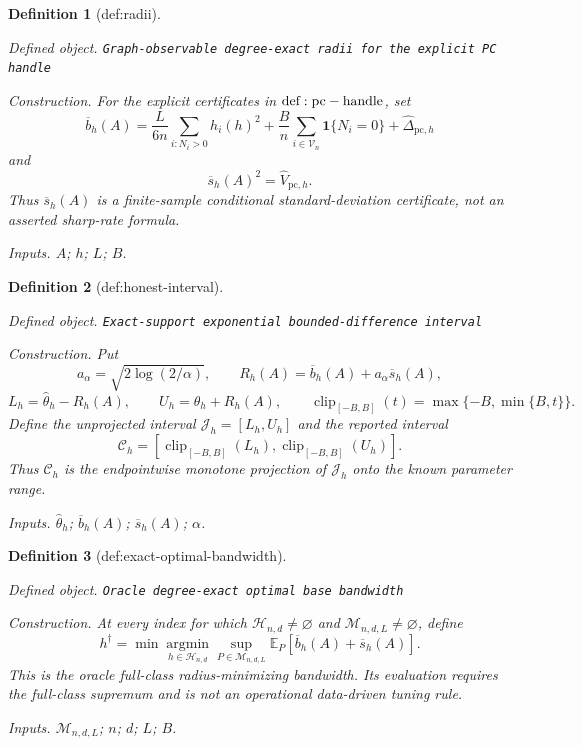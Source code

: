 \documentclass{article}
\newtheorem{definition}{Definition}
\begin{document}
\begin{definition}[def:radii]\label{def:radii}
\par\smallskip\noindent\emph{Defined object.} \texttt{Graph-\allowbreak{}observable degree-\allowbreak{}exact radii for the explicit PC handle}
\par\smallskip\noindent\emph{Construction.} For the explicit certificates in \({\rm def:pc-handle}\), set
\[
 \overline b_h(A)=\frac{L}{6n}\sum_{i:N_i>0}h_i(h)^2
 +\frac{B}{n}\sum_{i\in\mathcal V_n}\mathbf1\{N_i=0\}
 +\widehat\Delta_{\mathrm{pc},h}
\]
and
\[
 \overline s_h(A)^2=\widehat V_{\mathrm{pc},h}.
\]
Thus \(\overline s_h(A)\) is a finite-sample conditional standard-deviation certificate, not an asserted sharp-rate formula.
\par\smallskip\noindent\emph{Inputs.} \(A\); \(h\); \(L\); \(B\).
\end{definition}

\begin{definition}[def:honest-interval]\label{def:honest-interval}
\par\smallskip\noindent\emph{Defined object.} \texttt{Exact-\allowbreak{}support exponential bounded-\allowbreak{}difference interval}
\par\smallskip\noindent\emph{Construction.} Put
\[
 a_\alpha=\sqrt{2\log(2/\alpha)},\qquad
 R_h(A)=\overline b_h(A)+a_\alpha\overline s_h(A),
\]
\[
 L_h=\widehat\theta_h-R_h(A),\qquad
 U_h=\widehat\theta_h+R_h(A),\qquad
 \operatorname{clip}_{[-B,B]}(t)=\max\{-B,\min\{B,t\}\}.
\]
Define the unprojected interval \(\mathcal J_h=[L_h,U_h]\) and the reported interval
\[
 \mathcal C_h=
 [\operatorname{clip}_{[-B,B]}(L_h),
  \operatorname{clip}_{[-B,B]}(U_h)].
\]
Thus \(\mathcal C_h\) is the endpointwise monotone projection of \(\mathcal J_h\) onto the known parameter range.
\par\smallskip\noindent\emph{Inputs.} \(\widehat\theta_h\); \(\overline b_h(A)\); \(\overline s_h(A)\); \(\alpha\).
\end{definition}

\begin{definition}[def:exact-optimal-bandwidth]\label{def:exact-optimal-bandwidth}
\par\smallskip\noindent\emph{Defined object.} \texttt{Oracle degree-\allowbreak{}exact optimal base bandwidth}
\par\smallskip\noindent\emph{Construction.} At every index for which \(\mathcal H_{n,d}\ne\varnothing\) and \(\mathcal M_{n,d,L}\ne\varnothing\), define
\[
 h^\dagger=\min\operatorname*{argmin}_{h\in\mathcal H_{n,d}}
 \sup_{P\in\mathcal M_{n,d,L}}
 \mathbb E_P[\overline b_h(A)+\overline s_h(A)].
\]
This is the oracle full-class radius-minimizing bandwidth.  Its evaluation requires the full-class supremum and is not an operational data-driven tuning rule.
\par\smallskip\noindent\emph{Inputs.} \(\mathcal M_{n,d,L}\); \(n\); \(d\); \(L\); \(B\).
\end{definition}
\end{document}

